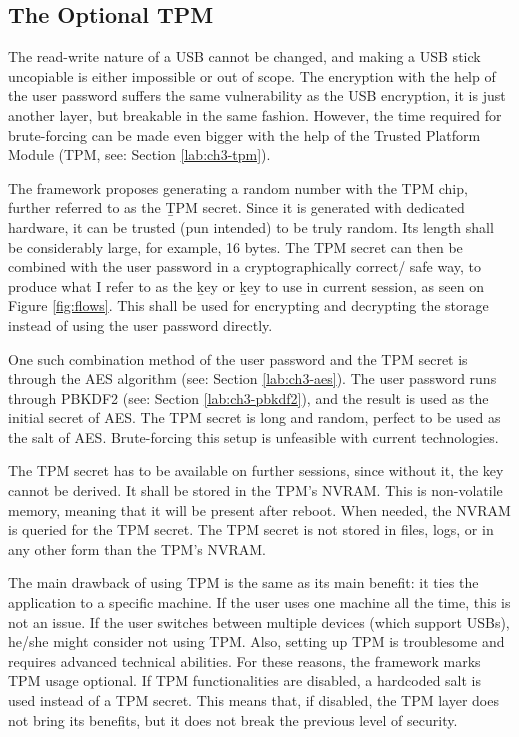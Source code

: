 \subsection{The Optional TPM} \label{lab:ch4-using-tpm}

The read-write nature of a USB cannot be changed, and making a USB stick uncopiable is either impossible or out of scope.
The encryption with the help of the user password suffers the same vulnerability as the USB encryption, it is just another layer, but breakable in the same fashion.
However, the time required for brute-forcing can be made even bigger with the help of the Trusted Platform Module (TPM, see: Section \ref{lab:ch3-tpm}).

The framework proposes generating a random number with the TPM chip, further referred to as the \b{TPM secret}.
Since it is generated with dedicated hardware, it can be trusted (pun intended) to be truly random.
Its length shall be considerably large, for example, 16 bytes.
The TPM secret can then be combined with the user password in a cryptographically correct/ safe way, to produce what I refer to as the \b{key} or \b{key to use in current session}, as seen on Figure \ref{fig:flows}.
This shall be used for encrypting and decrypting the storage instead of using the user password directly.

One such combination method of the user password and the TPM secret is through the AES algorithm (see: Section \ref{lab:ch3-aes}).
The user password runs through PBKDF2 (see: Section \ref{lab:ch3-pbkdf2}), and the result is used as the initial secret of AES.
The TPM secret is long and random, perfect to be used as the salt of AES.
Brute-forcing this setup is unfeasible with current technologies.

The TPM secret has to be available on further sessions, since without it, the key cannot be derived.
It shall be stored in the TPM's NVRAM.
This is non-volatile memory, meaning that it will be present after reboot.
When needed, the NVRAM is queried for the TPM secret.
The TPM secret is not stored in files, logs, or in any other form than the TPM's NVRAM.

The main drawback of using TPM is the same as its main benefit: it ties the application to a specific machine.
If the user uses one machine all the time, this is not an issue.
If the user switches between multiple devices (which support USBs), he/she might consider not using TPM.
Also, setting up TPM is troublesome and requires advanced technical abilities.
For these reasons, the framework marks TPM usage optional.
If TPM functionalities are disabled, a hardcoded salt is used instead of a TPM secret.
This means that, if disabled, the TPM layer does not bring its benefits, but it does not break the previous level of security.


